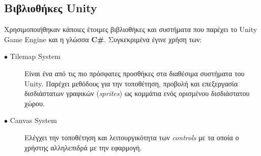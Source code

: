 \subsection{Βιβλιοθήκες Unity}
Χρησιμοποιήθηκαν κάποιες έτοιμες βιβλιοθήκες και συστήματα που παρέχει το Unity Game Engine και η γλώσσα \textbf{C\#}. Συγκεκριμένα έγινε χρήση των:

\begin{description}
\item[$\bullet$ Tilemap System] Είναι ένα από τις πιο πρόσφατες προσθήκες στα διαθέσιμα συστήματα του Unity. Παρέχει μεθόδους για την τοποθέτηση, προβολή και επεξεργασία δισδιάστατων γραφικών (\textit{sprites}) ως κομμάτια ενός ορισμένου δισδιάστατου χώρου. \cite{unitytilemap}
\item[$\bullet$ Canvas System] Ελέγχει την τοποθέτηση και λειτουργικότητα των \textit{controls} με τα οποία ο χρήστης αλληλεπιδρά με την εφαρμογή. \cite{unitycanvas}
\end{description}


